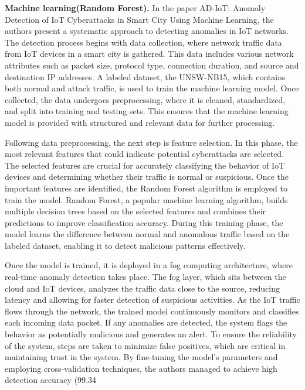 \textbf{Machine learning(Random Forest).} In the paper AD-IoT: Anomaly Detection of IoT Cyberattacks in Smart City Using Machine Learning, the authors present a systematic approach to detecting anomalies in IoT networks. The detection process begins with data collection, where network traffic data from IoT devices in a smart city is gathered. This data includes various network attributes such as packet size, protocol type, connection duration, and source and destination IP addresses. A labeled dataset, the UNSW-NB15, which contains both normal and attack traffic, is used to train the machine learning model. Once collected, the data undergoes preprocessing, where it is cleaned, standardized, and split into training and testing sets. This ensures that the machine learning model is provided with structured and relevant data for further processing.

Following data preprocessing, the next step is feature selection. In this phase, the most relevant features that could indicate potential cyberattacks are selected. The selected features are crucial for accurately classifying the behavior of IoT devices and determining whether their traffic is normal or suspicious. Once the important features are identified, the Random Forest algorithm is employed to train the model. Random Forest, a popular machine learning algorithm, builds multiple decision trees based on the selected features and combines their predictions to improve classification accuracy. During this training phase, the model learns the difference between normal and anomalous traffic based on the labeled dataset, enabling it to detect malicious patterns effectively.

Once the model is trained, it is deployed in a fog computing architecture, where real-time anomaly detection takes place. The fog layer, which sits between the cloud and IoT devices, analyzes the traffic data close to the source, reducing latency and allowing for faster detection of suspicious activities. As the IoT traffic flows through the network, the trained model continuously monitors and classifies each incoming data packet. If any anomalies are detected, the system flags the behavior as potentially malicious and generates an alert. To ensure the reliability of the system, steps are taken to minimize false positives, which are critical in maintaining trust in the system. By fine-tuning the model's parameters and employing cross-validation techniques, the authors managed to achieve high detection accuracy (99.34%

